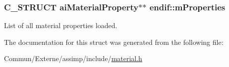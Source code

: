 \subsubsection[{\texorpdfstring{m\+Properties}{mProperties}}]{\setlength{\rightskip}{0pt plus 5cm}C\+\_\+\+S\+T\+R\+U\+CT ai\+Material\+Property$\ast$$\ast$ endif\+::m\+Properties}\hypertarget{structendif_a95295db8cbd37f02553457d84d65068a}{}\label{structendif_a95295db8cbd37f02553457d84d65068a}
List of all material properties loaded. 

The documentation for this struct was generated from the following file\+:\begin{DoxyCompactItemize}
\item 
Commun/\+Externe/assimp/include/\hyperlink{material_8h}{material.\+h}\end{DoxyCompactItemize}
